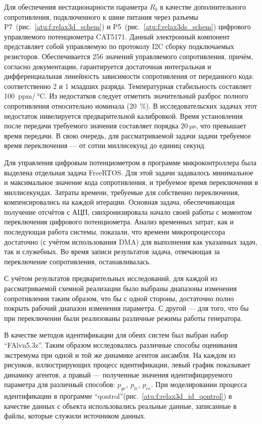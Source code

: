 Для обеспечения нестационарности параметра $R_b$
в качестве дополнительного сопротивления,
подключенного к шине питания через разъемы
P7~(рис.~\ref{atu:f:relax3d_schem}) и
P5~(рис.~\ref{atu:f:relax3ds_schem})
цифрового управляемого потенциометра CAT5171.
Данный электронный компонент представляет собой
управляемую по протоколу I2C сборку подключаемых резисторов.
Обеспечивается 256 значений управляемого сопротивления,
причём, согласно документации, гарантируется достаточная интегральная и
дифференциальная линейность зависимости сопротивления
от переданного кода: соответственно 2 и 1 младших разряда.
Температурная стабильность составляет 100~ppm/${}\SI{}{\celsius} $.
Из недостатков следует отметить значительный разброс полного сопротивления
относительно номинала (20~\%). В исследовательских
задачах этот недостаток нивелируется предварительной калибровкой.
Время установления после передачи требуемого значения составляет порядка
$\SI{20}{\micro\second}$,
что превышает время передачи. В свою очередь,
для рассматриваемой задачи задачи требуемое время
переключения --- от сотни миллисекунд до единиц секунд.

Для управления цифровым потенциометром в программе микроконтроллера была выделена
отдельная задача FreeRTOS. Для этой задачи задавалось
минимальное и максимальное значение кода сопротивления,
и требуемое время переключения в миллисекундах.
Затраты времени, требуемые для собственно переключения,
компенсировались на каждой итерации.
Основная задача, обеспечивающая получение отсчётов с АЦП,
синхронизировала начало своей работы
с моментом переключения цифрового потенциометра.
Анализ временных затрат, как и последующая работа системы,
показали, что времени микропроцессора достаточно (с учётом использования DMA)
для выполнения как указанных задач, так и служебных.
Во время записи результатов задача, отвечающая
за переключение сопротивления, останавливалась.

С учётом результатов предварительных исследований,
для каждой из рассматриваемой схемной реализации было выбраны
диапазоны изменения сопротивления таким образом, что бы
с одной стороны,
достаточно полно покрыть рабочий диапазон изменения параметра.
С другой --- для того, что бы при переключении были реализованы
различные режимы работы генератора.

В качестве методов идентификации для обеих систем был выбран набор
``FAlvn5.3z''. Таким образом исследовались различные способы оценивания экстремума
при одной и той же динамике агентов ансамбля.
На каждом из рисунков, иллюстрирующих процесс идентификации,
левый график показывает динамику агентов, а правый --- полученные
значения идентифицируемого параметра для различный способов:
$p_{ge}$, $p_{le}$, $p_{ee}$.
При моделировании процесса идентификации в программе ``qontrol''(рис.~\ref{atu:f:relax3d_id_qontrol})
в качестве данных с объекта использовались реальные данные,
записанные в файлы, которые служили источником данных.

